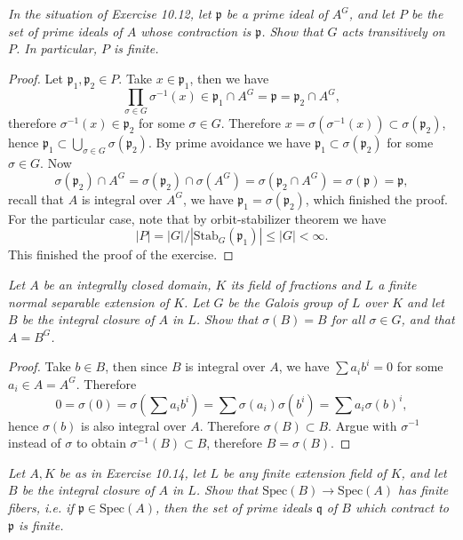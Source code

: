 \begin{problem}\em
In the situation of Exercise 10.12, let $\mathfrak{p}$ be a prime ideal of $A^G$, and let $P$ be the set of prime ideals of $A$ whose contraction is $\mathfrak{p}$. Show that $G$ acts transitively on $P$. In particular, $P$ is finite.
\end{problem}
\begin{proof}
Let $\mathfrak{p}_1,\mathfrak{p}_2\in P$. Take $x\in\mathfrak{p}_1$, then we have 
$$
\prod_{\sigma \in G}{\sigma ^{-1}\left( x \right)}\in \mathfrak{p} _1\cap A^G=\mathfrak{p} =\mathfrak{p} _2\cap A^G,
$$
therefore $\sigma^{-1}(x)\in\mathfrak{p}_2$ for some $\sigma\in G$. Therefore $x=\sigma \left( \sigma ^{-1}\left( x \right) \right) \subset \sigma \left( \mathfrak{p} _2 \right) $, hence $\mathfrak{p} _1\subset \bigcup_{\sigma \in G}{\sigma \left( \mathfrak{p} _2 \right)}$. By prime avoidance we have $\mathfrak{p}_1\subset\sigma(\mathfrak{p}_2)$ for some $\sigma\in G$. Now 
$$
\sigma \left( \mathfrak{p} _2 \right) \cap A^G=\sigma \left( \mathfrak{p} _2 \right) \cap \sigma \left( A^G \right) =\sigma \left( \mathfrak{p} _2\cap A^G \right) =\sigma \left( \mathfrak{p} \right) =\mathfrak{p} ,
$$
recall that $A$ is integral over $A^G$, we have $\mathfrak{p}_1=\sigma(\mathfrak{p}_2)$, which finished the proof. For the particular case, note that by orbit-stabilizer theorem we have 
$$
\left| P \right|=\left| G \right|/\left| \mathrm{Stab}_G\left( \mathfrak{p} _1 \right) \right|\le \left| G \right|<\infty .
$$
This finished the proof of the exercise.
\end{proof}
\begin{problem}\em
Let $A$ be an integrally closed domain, $K$ its field of fractions and $L$ a finite normal separable extension of $K$. Let $G$ be the Galois group of $L$ over $K$ and let $B$ be the integral closure of $A$ in $L$. Show that $\sigma(B)=B$ for all $\sigma\in G$, and that $A=B^G$.
\end{problem}
\begin{proof}
Take $b\in B$, then since $B$ is integral over $A$, we have $\sum a_ib^i=0$ for some $a_i\in A=A^G$. Therefore 
$$
0=\sigma \left( 0 \right) =\sigma \left( \sum{a_ib^i} \right) =\sum{\sigma \left( a_i \right) \sigma \left( b^i \right)}=\sum{a_i\sigma \left( b \right) ^i},
$$
hence $\sigma(b)$ is also integral over $A$. Therefore $\sigma(B)\subset B$. Argue with $\sigma^{-1}$ instead of $\sigma$ to obtain $\sigma^{-1}(B)\subset B$, therefore $B=\sigma(B)$.
\end{proof}
\begin{problem}\em
Let $A,K$ be as in Exercise 10.14, let $L$ be any finite extension field of $K$, and let $B$ be the integral closure of $A$ in $L$. Show that $\mathrm{Spec}(B)\to\mathrm{Spec}(A)$ has finite fibers, i.e. if $\mathfrak{p}\in\mathrm{Spec}(A)$, then the set of prime ideals $\mathfrak{q}$ of $B$ which contract to $\mathfrak{p}$ is finite.
\end{problem}
